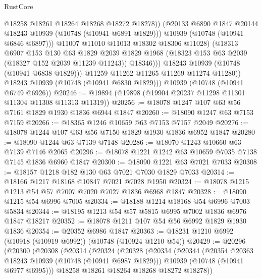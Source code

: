 \begin{lexlean}{RustCore}
\begin{coremodule}
                        @18258
                        @18261
                        @18264
                        @18268
                        @18272
                        @18278))
                    (@20133 @6890 @1847 @20144 @18243 @10939 (@10748 (@10941 @6891 @1829)))
                    @10939
                    (@10748 (@10941 @6846 @6897)))
                  @11007
                  @11010
                  @11013
                  @18302
                  @18306
                  @11028)
                (@18313
                  @6907
                  @153
                  @130
                  @63
                  @1829
                  @2039
                  @1829
                  @1968
                  (@18323 @153 @63 @2039 (@18327 @152 @2039 @11239 @11243))
                  @18346)))
            @18243
            @10939
            (@10748 (@10941 @6838 @1829)))
          @11259
          @11262
          @11265
          @11269
          @11274
          @11280))
      @18243
      @10939
      (@10748 (@10941 @6830 @1829)))
    @10939
    (@10748 (@10941 @6749 @6926))
@20246 := @19894 (@19898 (@19904 @20237 @11298 @11301 @11304 @11308 @11313 @11319))
@20256 := @18078 @1247 @107 @63 @56 @7161 @1829 @1930 @1836 @6944 @1847
@20260 := @18090 @1247 @63 @7153 @7159
@20266 := @18365 @1246 @10659 @63 @7153 @7157 @2049
@20276 := @18078 @1244 @107 @63 @56 @7150 @1829 @1930 @1836 @6952 @1847
@20280 := @18090 @1244 @63 @7139 @7148
@20286 := @18070 @1243 @10660 @63 @7139 @7146 @2065
@20296 := @18078 @1221 @1242 @63 @10659 @7035 @7138 @7145 @1836 @6960 @1847
@20300 := @18090 @1221 @63 @7021 @7033
@20308 := @18157 @1218 @182 @130 @63 @7021 @7030 @1829 @7033
@20314 := @18166 @1217 @18168 @10847 @7021 @7028 @1950
@20324 := @18078 @1215 @1213 @54 @57 @7007 @7020 @7027 @1836 @6968 @1847
@20328 := @18090 @1215 @54 @6996 @7005
@20334 := @18188 @1214 @18168 @54 @6996 @7003 @5834
@20344 := @18195 @1213 @54 @57 @5815 @6995 @7002 @1836 @6976 @1847 @18217
@20352 := @18078 @1211 @107 @54 @56 @6992 @1829 @1930 @1836
@20354 := @20352 @6986 @1847
@20363 := @18231 @1210 @6992 (@10918 (@10919 @6992)) (@10748 (@10924 @1210 @54))
@20429 := @20296
    (@20300
      (@20308
        (@20314
          (@20324
            (@20328
              (@20334
                (@20344
                  (@20354 @20363 @18243 @10939 (@10748 (@10941 @6987 @1829)))
                  @10939
                  (@10748 (@10941 @6977 @6995)))
                @18258
                @18261
                @18264
                @18268
                @18272
                @18278))

\end{coremodule}
\end{lexlean}
